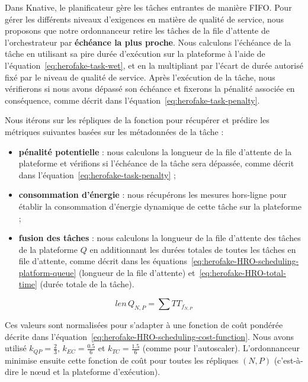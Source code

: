Dans Knative, le planificateur gère les tâches entrantes de manière FIFO. Pour gérer les différents niveaux d'exigences en matière de qualité de service, nous proposons que notre ordonnanceur retire les tâches de la file d'attente de l'orchestrateur par \textbf{échéance la plus proche}. Nous calculons l'échéance de la tâche en utilisant sa pire durée d'exécution sur la plateforme à l'aide de l'équation~\ref{eq:herofake-task-wet}, et en la multipliant par l'écart de durée autorisé fixé par le niveau de qualité de service. Après l'exécution de la tâche, nous vérifierons si nous avons dépassé son échéance et fixerons la pénalité associée en conséquence, comme décrit dans l'équation~\ref{eq:herofake-task-penalty}. 

Nous itérons sur les répliques de la fonction pour récupérer et prédire les métriques suivantes basées sur les métadonnées de la tâche :

\begin{itemize}
    \item \textbf{pénalité potentielle} : nous calculons la longueur de la file d'attente de la plateforme et vérifions si l'échéance de la tâche sera dépassée, comme décrit dans l'équation~\ref{eq:herofake-task-penalty} ;
    \item \textbf{consommation d'énergie} : nous récupérons les mesures hors-ligne pour établir la consommation d'énergie dynamique de cette tâche sur la plateforme ;
    \item \textbf{fusion des tâches} : nous calculons la longueur de la file d'attente des tâches de la plateforme $Q$ en additionnant les durées totales de toutes les tâches en file d'attente, comme décrit dans les équations~\ref{eq:herofake-HRO-scheduling-platform-queue} (longueur de la file d'attente) et~\ref{eq:herofake-HRO-total-time} (durée totale de la tâche). 
\end{itemize}

\begin{equation}
    len \, Q_{N, P} = \sum TT_{f_{N, P}}
\label{eq:herofake-HRO-scheduling-platform-queue}
\end{equation}

Ces valeurs sont normalisées pour s'adapter à une fonction de coût pondérée décrite dans l'équation~\ref{eq:herofake-HRO-scheduling-cost-function}. Nous avons utilisé $k_{QP} = \frac{2}{3}$, $k_{EC} = \frac{0.5}{6}$ et $k_{TC} = \frac{1.5}{6}$ (comme pour l'autoscaler). L'ordonnanceur minimise ensuite cette fonction de coût pour toutes les répliques $(N, P)$ (c'est-à-dire le nœud et la plateforme d'exécution).

